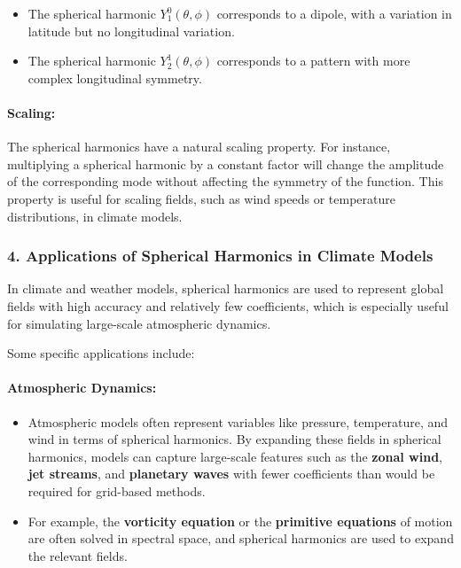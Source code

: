\begin{itemize}
    \item The spherical harmonic $Y_1^0(\theta,\phi)$ corresponds to a dipole, with a variation in latitude but no longitudinal variation.
    \item The spherical harmonic $Y_2^1(\theta,\phi)$ corresponds to a pattern with more complex longitudinal symmetry.
\end{itemize}

\paragraph{\textbf{Scaling}:}

The spherical harmonics have a natural scaling property. For instance, multiplying a spherical harmonic by a constant factor will change the amplitude of the corresponding mode without affecting the symmetry of the function. This property is useful for scaling fields, such as wind speeds or temperature distributions, in climate models.

\subsubsection{4. \textbf{Applications of Spherical Harmonics in Climate Models}}

In climate and weather models, spherical harmonics are used to represent global fields with high accuracy and relatively few coefficients, which is especially useful for simulating large-scale atmospheric dynamics.

Some specific applications include:

\paragraph{\textbf{Atmospheric Dynamics}:}

\begin{itemize}
    \item Atmospheric models often represent variables like pressure, temperature, and wind in terms of spherical harmonics. By expanding these fields in spherical harmonics, models can capture large-scale features such as the \textbf{zonal wind}, \textbf{jet streams}, and \textbf{planetary waves} with fewer coefficients than would be required for grid-based methods.
    \item For example, the \textbf{vorticity equation} or the \textbf{primitive equations} of motion are often solved in spectral space, and spherical harmonics are used to expand the relevant fields.
\end{itemize}

